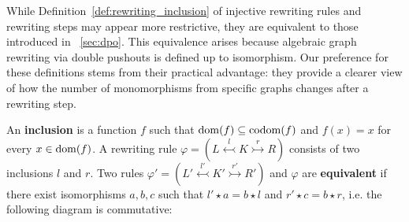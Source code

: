 While Definition~\ref{def:rewriting_inclusion} of injective rewriting rules and rewriting steps may appear more restrictive, they are equivalent to those introduced in \textsection~\ref{sec:dpo}. This equivalence arises because algebraic graph rewriting via double pushouts is defined up to isomorphism. Our preference for these definitions stems from their practical advantage: they provide a clearer view of how the number of monomorphisms from specific graphs changes after a rewriting step. 
 
\begin{definition}
    \label{def:rewriting_inclusion}
    An \textbf{inclusion} is a function $f$ such that $\operatorname{dom}(f) \subseteq \operatorname{codom}(f)$ and $f(x) = x$ for every $x \in \operatorname{dom}(f)$.
    A rewriting rule $\varphi = (L \overset{l}{\leftarrowtail} K \overset{r}{\rightarrowtail} R)$ consists of two inclusions $l$ and $r$.  
    Two rules $\varphi' = (L' \overset{l'}{\leftarrowtail} K' \overset{r'}{\rightarrowtail} R')$ and $\varphi$ are \textbf{equivalent} if there exist isomorphisms $a,b,c$ such that 
    $l' \star a = b \star l$ and $r' \star c = b \star r$, i.e. the following diagram is commutative:    
            \begin{center}
\end{center}
\end{definition}
